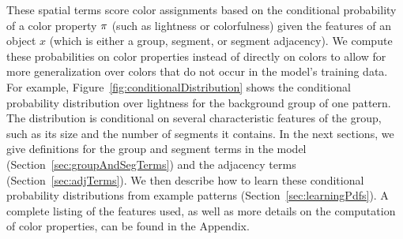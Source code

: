 These spatial terms score color assignments based on the conditional probability of a color property $\pi$ (such as lightness or colorfulness) given the features of an object $x$ (which is either a group, segment, or segment adjacency). We compute these probabilities on color properties instead of directly on colors to allow for more generalization over colors that do not occur in the model's training data.
For example, Figure~\ref{fig:conditionalDistribution} shows the conditional probability distribution over lightness for the background group of one pattern. The distribution is conditional on several characteristic features of the group, such as its size and the number of segments it contains. In the next sections, we give definitions for the group and segment terms in the model (Section~\ref{sec:groupAndSegTerms}) and the adjacency terms (Section~\ref{sec:adjTerms}). We then describe how to learn these conditional probability distributions from example patterns (Section~\ref{sec:learningPdfs}). A complete listing of the features used, as well as more details on the computation of color properties, can be found in the Appendix.

